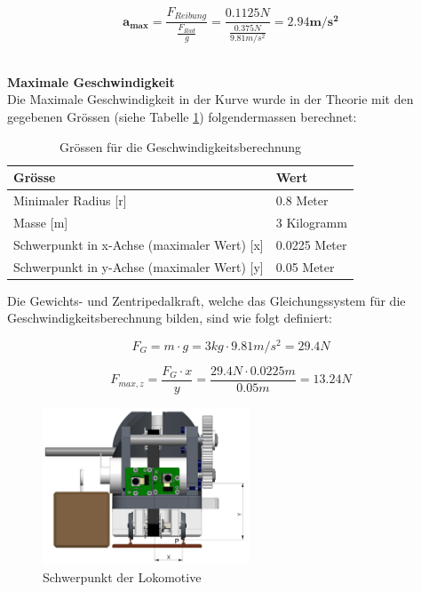 \documentclass[../../main.tex]{subfiles}
\begin{document}
$$\boldsymbol{a_{max}}=\frac{F_{Reibung}}{\frac{F_{Rad}}{g}}=\frac{0.1125N}{\frac{0.375N}{9.81m/s^2}}=\boldsymbol{2.94m/s^2}$$
\\

\pagebreak

\textbf{Maximale Geschwindigkeit}\\
Die Maximale Geschwindigkeit in der Kurve wurde in der Theorie mit den gegebenen Grössen (siehe Tabelle \ref{tab:geschwindigkeitsberechnung}) folgendermassen berechnet:\\

\begin{table}[H] \centering
    \begin{tabular}{|l|l|}
    \hline
    \textbf{Grösse} & \textbf{Wert}\\
    \hline
    Minimaler Radius  [r]                               & 0.8 Meter\\
     \hline
    Masse [m]                                           & 3 Kilogramm\\
    \hline
    Schwerpunkt in x-Achse (maximaler Wert) [x]         & 0.0225 Meter\\
    \hline
    Schwerpunkt in y-Achse (maximaler Wert) [y]         & 0.05 Meter\\
    \hline
    \end{tabular}

    \caption{Grössen für die Geschwindigkeitsberechnung}
    \label{tab:geschwindigkeitsberechnung}
    \end{table}

Die Gewichts- und Zentripedalkraft, welche das Gleichungssystem für die Geschwindigkeitsberechnung bilden, sind wie folgt definiert:

$$F_{G}=m \cdot g=3kg \cdot 9.81m/s^2=29.4N$$

$$F_{max, z}=\frac{F_{G} \cdot x}{y}=\frac{29.4N \cdot 0.0225m}{0.05m}=13.24N$$

\begin{figure}[H]
    \centering
    \includegraphics[width=0.55\textwidth]{schwerpunkt.PNG}
    \caption {Schwerpunkt der Lokomotive}
    \label{fig:schwerpunkt}
\end{figure}
\end{document}
